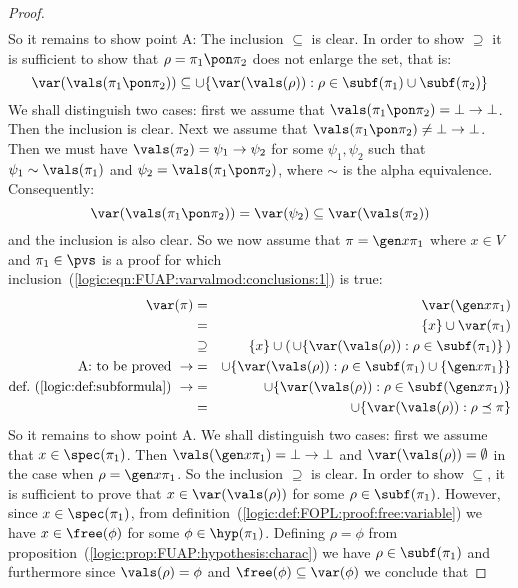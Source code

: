 \begin{proof}
\begin{eqnarray*}
    \end{eqnarray*}
So it remains to show point A: The inclusion $\subseteq$ is clear.
In order to show $\supseteq$ it is sufficient to show that
$\rho=\pi_{1}\pon\pi_{2}$ does not enlarge the set, that is:
    \[
    \var(\vals(\pi_{1}\pon\pi_{2}))\subseteq
    \cup\{\var(\vals(\rho)):\rho\in\subf(\pi_{1})\cup\subf(\pi_{2})\}
    \]
We shall distinguish two cases: first we assume that
$\vals(\pi_{1}\pon\pi_{2})=\bot\to\bot$. Then the inclusion is
clear. Next we assume that
$\vals(\pi_{1}\pon\pi_{2})\neq\bot\to\bot$. Then we must have
$\vals(\pi_{2})=\psi_{1}\to\psi_{2}$ for some $\psi_{1},\psi_{2}$
such that $\psi_{1}\sim\vals(\pi_{1})$ and
$\psi_{2}=\vals(\pi_{1}\pon\pi_{2})$, where $\sim$ is the
alpha equivalence. Consequently:
    \[
    \var(\vals(\pi_{1}\pon\pi_{2}))=\var(\psi_{2})\subseteq\var(\vals(\pi_{2}))
    \]
and the inclusion is also clear. So we now assume that $\pi=\gen
x\pi_{1}$ where $x\in V$ and $\pi_{1}\in\pvs$ is a proof for which
inclusion~(\ref{logic:eqn:FUAP:varvalmod:conclusions:1}) is true:
    \begin{eqnarray*}
    \var(\pi)&=&\var(\gen x\pi_{1})\\
    &=&\{x\}\cup\var(\pi_{1})\\
    &\supseteq&\{x\}\cup(\,\cup\{\var(\vals(\rho)):\rho\in\subf(\pi_{1})\}\,)\\
    \mbox{A: to be proved}\ \rightarrow&=&
    \cup\{\var(\vals(\rho)):\rho\in\subf(\pi_{1})\cup\{\gen x\pi_{1}\}\}\\
    \mbox{def.~(\ref{logic:def:subformula})}\ \rightarrow
    &=&\cup\{\var(\vals(\rho)):\rho\in\subf(\gen x\pi_{1})\}\\
    &=&\cup\{\var(\vals(\rho)):\rho\preceq\pi\}\\
    \end{eqnarray*}
So it remains to show point A. We shall distinguish two cases: first
we assume that $x\in\spec(\pi_{1})$. Then $\vals(\gen
x\pi_{1})=\bot\to\bot$ and $\var(\vals(\rho))=\emptyset$ in the case
when $\rho=\gen x\pi_{1}$. So the inclusion $\supseteq$ is clear. In
order to show $\subseteq$, it is sufficient to prove that
$x\in\var(\vals(\rho))$ for some $\rho\in\subf(\pi_{1})$. However,
since $x\in\spec(\pi_{1})$, from
definition~(\ref{logic:def:FOPL:proof:free:variable}) we have
$x\in\free(\phi)$ for some $\phi\in\hyp(\pi_{1})$. Defining
$\rho=\phi$ from
proposition~(\ref{logic:prop:FUAP:hypothesis:charac}) we have
$\rho\in\subf(\pi_{1})$ and furthermore since $\vals(\rho)=\phi$ and
$\free(\phi)\subseteq\var(\phi)$ we conclude that

\end{proof}
